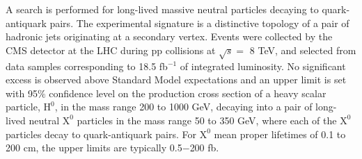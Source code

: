 A search is performed for long-lived massive neutral particles decaying
 to quark-antiquark pairs. The experimental signature is a distinctive topology of a pair of
 hadronic jets originating at a
 secondary vertex.
 Events were collected by the CMS detector at the LHC during pp collisions at $\sqrt{s}=$ 8 TeV, and selected from data samples corresponding to 18.5 fb$^{-1}$ of integrated luminosity. No significant excess
 is observed above Standard Model expectations and an upper limit is set with 95$\%$ confidence level
 on the production cross section of a heavy scalar particle,
  $\text{H}^0$, in the mass range 200 to 1000 GeV, decaying into a pair of long-lived neutral $\text{X}^0$
   particles in the mass
   range 50 to 350 GeV, where each of the $\text{X}^0$ particles decay to quark-antiquark pairs. For $\text{X}^0$ mean proper lifetimes
   of 0.1 to 200 cm,
    the upper limits are typically 0.5$-$200 fb.
